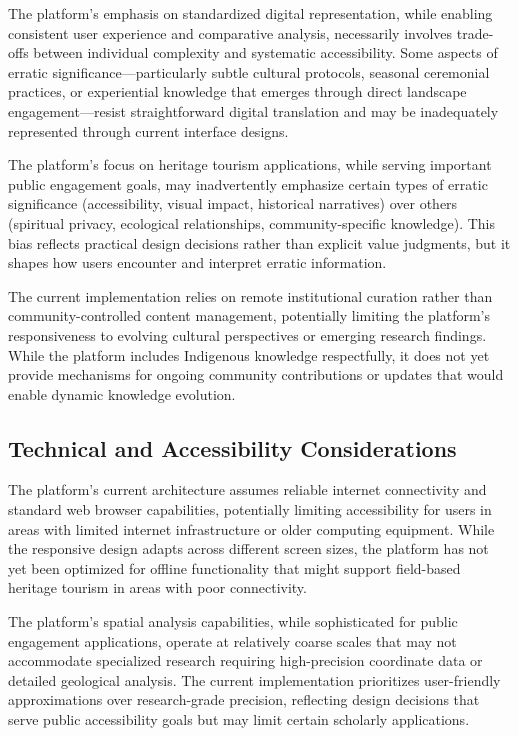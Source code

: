 The platform's emphasis on standardized digital representation, while enabling consistent user experience and comparative analysis, necessarily involves trade-offs between individual complexity and systematic accessibility. Some aspects of erratic significance—particularly subtle cultural protocols, seasonal ceremonial practices, or experiential knowledge that emerges through direct landscape engagement—resist straightforward digital translation and may be inadequately represented through current interface designs.

The platform's focus on heritage tourism applications, while serving important public engagement goals, may inadvertently emphasize certain types of erratic significance (accessibility, visual impact, historical narratives) over others (spiritual privacy, ecological relationships, community-specific knowledge). This bias reflects practical design decisions rather than explicit value judgments, but it shapes how users encounter and interpret erratic information.

The current implementation relies on remote institutional curation rather than community-controlled content management, potentially limiting the platform's responsiveness to evolving cultural perspectives or emerging research findings. While the platform includes Indigenous knowledge respectfully, it does not yet provide mechanisms for ongoing community contributions or updates that would enable dynamic knowledge evolution.

\subsection{Technical and Accessibility Considerations}
\label{subsec:technical_limitations}

The platform's current architecture assumes reliable internet connectivity and standard web browser capabilities, potentially limiting accessibility for users in areas with limited internet infrastructure or older computing equipment. While the responsive design adapts across different screen sizes, the platform has not yet been optimized for offline functionality that might support field-based heritage tourism in areas with poor connectivity.

The platform's spatial analysis capabilities, while sophisticated for public engagement applications, operate at relatively coarse scales that may not accommodate specialized research requiring high-precision coordinate data or detailed geological analysis. The current implementation prioritizes user-friendly approximations over research-grade precision, reflecting design decisions that serve public accessibility goals but may limit certain scholarly applications.

